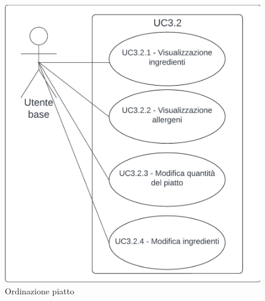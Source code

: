 \begin{figure}[H]
    \centering
    \includegraphics[scale=0.2]{ucd/UCD3.2_finale.png}
    \caption{Ordinazione piatto}
\end{figure}

